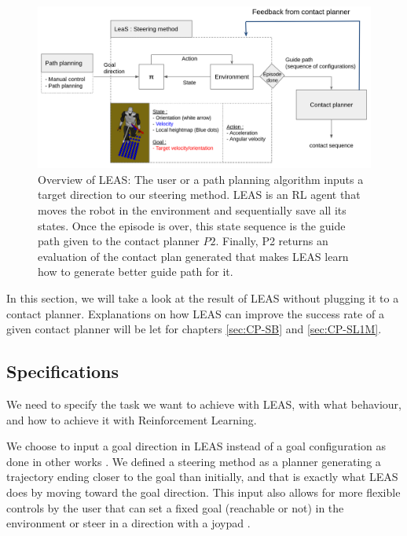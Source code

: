 \begin{figure}
    \centering
    \includegraphics[width=\textwidth]{Figures/Chapter_LEAS/leas_overview.png}
    \caption{Overview of LEAS: The user or a path planning algorithm inputs a target direction to our steering method. LEAS is an RL agent that moves the robot in the environment and sequentially save all its states. Once the episode is over, this state sequence is the guide path given to the contact planner $P2$. Finally, P2 returns an evaluation of the contact plan generated that makes LEAS learn how to generate better guide path for it.}
    \label{fig:LEAS}
\end{figure}

In this section, we will take a look at the result of LEAS without plugging it to a contact planner.
Explanations on how LEAS can improve the success rate of a given contact planner will be let for chapters \ref{sec:CP-SB} and \ref{sec:CP-SL1M}.

\subsection{Specifications \label{subsubsec:specifications}}
We need to specify the task we want to achieve with LEAS, with what behaviour, and how to achieve it with Reinforcement Learning.

We choose to input a goal direction in LEAS instead of a goal configuration as done in other works \cite{kinodynamic-sm,DIMT,RL_RRT}.
We defined a steering method as a planner generating a trajectory ending closer to the goal than initially, and that is exactly what LEAS does by moving toward the goal direction.
This input also allows for more flexible controls by the user that can set a fixed goal (reachable or not) in the environment or steer in a direction with a joypad \cite{AcyclicCP}.


